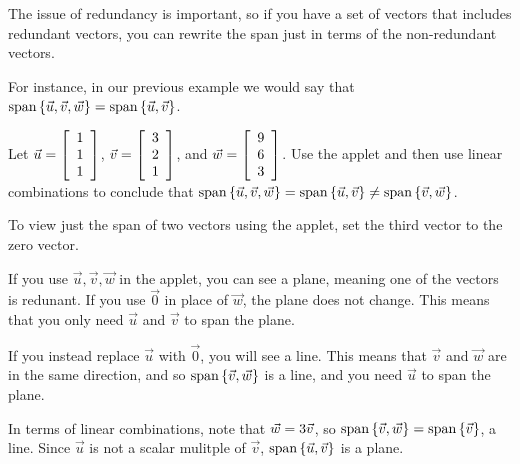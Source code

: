 \documentclass{ximera}
\begin{document}
\begin{exploration}
  The issue of redundancy is important, so if you have a set of vectors that includes redundant vectors, you can rewrite the span just in terms of the non-redundant vectors.

  For instance, in our previous example we would say that $\sspan\set{\vect{u},\vect{v},\vect{w}}=\sspan\set{\vect{u},\vect{v}}$.



\begin{example}
  Let $\vect{u}=\startmat{r} 1 \\ 1 \\ 1 \stopmat$,
  $\vect{v}=\startmat{r} 3 \\ 2 \\ 1 \stopmat$, and
  $\vect{w}=\startmat{r} 9 \\ 6 \\ 3 \stopmat$.
  Use the applet and then use linear combinations to conclude that
  $\sspan\set{\vect{u},\vect{v},\vect{w}} =
  \sspan\set{\vect{u},\vect{v}}\neq\sspan\set{\vec{v},\vec{w}}$.
\end{example}

\begin{hint}

  To view just the span of two vectors using the applet, set the third vector to the zero vector. 

\end{hint}

\begin{center}
\end{center}


\begin{solution}
  
  If you use $\vec{u}, \vec{v}, \vec{w}$ in the applet, you can see a plane, meaning one of the vectors is redunant. If you use $\vec{0}$ in place of $\vec{w}$, the plane does not change. This means that you only need $\vec{u}$ and $\vec{v}$ to span the plane.
  
  If you instead replace $\vec{u}$ with $\vec{0}$, you will see a line. This means that $\vec{v}$ and $\vec{w}$ are in the same direction, and so $\sspan\set{\vec{v},\vec{w}}$ is a line, and you need $\vec{u}$ to span the plane.
  
  In terms of linear combinations, note that $\vect{w} = 3\vect{v}$, so $\sspan\set{\vec{v},\vec{w}}=\sspan\set{\vec{v}}$, a line. Since $\vec{u}$ is not a scalar mulitple of $\vec{v}$, $\sspan\set{\vec{u},\vec{v}}$ is a plane.
  
  
\end{solution}

\end{exploration}
\end{document}
